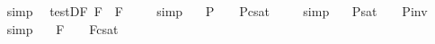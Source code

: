 \begin{isabellebody}
\ %
\endisadelimproof
%
\isatagproof
{}\isamarkupfalse%
\ simp\ \isamarkupfalse%
%
\endisatagproof
{\isafoldproof}%
%
\isadelimproof
%
\endisadelimproof
\isanewline
{}\isamarkupfalse%
\ test{\isacharunderscore}D{\isacharunderscore}F{\isacharcolon}\ {\isachardoublequoteopen}{\isacharbrackleft}\isactrlbold {\isasymdiamond}{\isacharparenleft}\isactrlbold {\isasymbox}{\isacharparenleft}{\isasymphi}\isactrlsup F{\isacharparenright}{\isacharparenright}\ \isactrlbold {\isasymrightarrow}\ \isactrlbold {\isasymbox}{\isacharparenleft}{\isasymphi}\isactrlsup F{\isacharparenright}{\isacharbrackright}\ {\isacharequal}\ {\isasymtop}{\isachardoublequoteclose}%
\isadelimproof
\ %
\endisadelimproof
%
\isatagproof
{}\isamarkupfalse%
\ simp\ \isamarkupfalse%
%
\endisatagproof
{\isafoldproof}%
%
\isadelimproof
%
\endisadelimproof
%
\isamarkuptrue%
\isamarkupfalse%
\ \ {\isachardoublequoteopen}{\isacharbrackleft}{\isasymphi}\isactrlsup P{\isacharbrackright}\ {\isacharequal}\ {\isasymtop}\ {\isasymlongleftrightarrow}\ {\isacharbrackleft}{\isasymphi}\isactrlsup P{\isacharbrackright}\isactrlsup c\isactrlsup s\isactrlsup a\isactrlsup t\ {\isacharequal}\ {\isasymbottom}{\isachardoublequoteclose}%
\isadelimproof
\ %
\endisadelimproof
%
\isatagproof
{}\isamarkupfalse%
\ simp\ \isamarkupfalse%
%
\endisatagproof
{\isafoldproof}%
%
\isadelimproof
%
\endisadelimproof
\isanewline
{}\isamarkupfalse%
\ \ {\isachardoublequoteopen}{\isacharbrackleft}{\isasymphi}\isactrlsup P{\isacharbrackright}\isactrlsup s\isactrlsup a\isactrlsup t\ {\isacharequal}\ {\isasymtop}\ {\isasymlongleftrightarrow}\ {\isacharbrackleft}{\isasymphi}\isactrlsup P{\isacharbrackright}\isactrlsup i\isactrlsup n\isactrlsup v\ {\isacharequal}\ {\isasymbottom}{\isachardoublequoteclose}%
\isadelimproof
\ %
\endisadelimproof
%
\isatagproof
{}\isamarkupfalse%
\ simp\ \isamarkupfalse%
%
\endisatagproof
{\isafoldproof}%
%
\isadelimproof
%
\endisadelimproof
\isanewline
{}\isamarkupfalse%
\ \ {\isachardoublequoteopen}{\isacharbrackleft}{\isasymphi}\isactrlsup F{\isacharbrackright}\ {\isacharequal}\ {\isasymtop}\ {\isasymlongleftrightarrow}\ {\isacharbrackleft}{\isasymphi}\isactrlsup F{\isacharbrackright}\isactrlsup c\isactrlsup s\isactrlsup a\isactrlsup t\ {\isacharequal}\ {\isasymbottom}{\isachardoublequoteclose}%
\isadelimproof
\ %
\endisadelimproof
%
\isatagproof
{}\isamarkupfalse%

\end{isabellebody}
